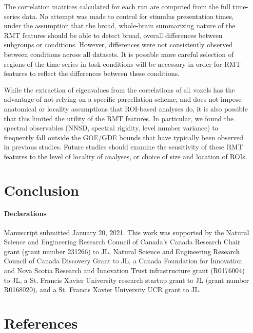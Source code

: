 The correlation matrices calculated for each run are computed from the full time-series data. No
attempt was made to control for stimulus presentation times, under the assumption that the broad,
whole-brain summarizing nature of the RMT features should be able to detect broad, overall
differences between subgroups or conditions. However, differences were not consistently observed
between conditions across all datasets. It is possible more careful selection of regions of the
time-series in task conditions will be necessary in order for RMT features to reflect the
differences between these conditions.

While the extraction of eigenvalues from the correlations of all voxels has the advantage of not
relying on a specific parcellation scheme, and does not impose anatomical or locality assumptions
that ROI-based analyses do, it is also possible that this limited the utility of the RMT features.
In particular, we found the spectral observables (NNSD, spectral rigidity, level number variance) to
frequently fall outside the GOE/GDE bounds that have typically been observed in previous studies.
Future studies should examine the sensitivity of these RMT features to the level of locality of
analyses, or choice of size and location of ROIs.

\section{Conclusion}


\paragraph{Declarations}
Manuscript submitted January 20, 2021. This work was supported by the  Natural Science and
Engineering Research Council of Canada's Canada Research Chair grant (grant number 231266) to JL,
Natural Science and Engineering Research Council of Canada Discovery Grant to JL, a Canada
Foundation for Innovation and Nova Scotia Research and Innovation Trust infrastructure grant
(R0176004) to JL, a St. Francis Xavier University research startup grant to JL (grant number
R0168020), and a St. Francis Xavier University UCR grant to JL.

\section{References}
\printbibliography{}

